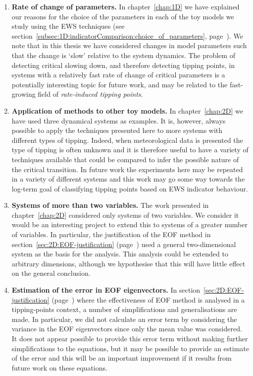 \begin{enumerate}
	\item {\bf Rate of change of parameters.} In chapter~\ref{chap:1D} we have explained our reasons for the choice of the parameters in each of the toy models we study using the EWS techniques (see section~\ref{subsec:1D:indicatorComparison:choice_of_parameters}, page~\pageref{subsec:1D:indicatorComparison:choice_of_parameters}). We note that in this thesis we have considered changes in model parameters such that the change is `slow' relative to the system dynamics. The problem of detecting critical slowing down, and therefore detecting tipping points, in systems with a relatively fast rate of change of critical parameters is a potentially interesting topic for future work, and may be related to the fast-growing field of \emph{rate-induced tipping points}. 
	
	\item {\bf Application of methods to other toy models.} In chapter~\ref{chap:2D} we have used three dynamical systems as examples. It is, however, always possible to apply the techniques presented here to more systems with different types of tipping. Indeed, when meteorological data is presented the type of tipping is often unknown and it is therefore useful to have a variety of techniques available that could be compared to infer the possible nature of the critical transition. In future work the experiments here may be repeated in a variety of different systems and this work may go some way towards the log-term goal of classifying tipping points based on EWS indicator behaviour.
	
	\item {\bf Systems of more than two variables.} The work presented in chapter~\ref{chap:2D} considered only systems of two variables. We consider it would be an interesting project to extend this to systems of a greater number of variables. In particular, the justification of the EOF method in section~\ref{sec:2D:EOF-justification} (page~\pageref{sec:2D:EOF-justification}) used a general two-dimensional system as the basis for the analysis. This analysis could be extended to arbitrary dimensions, although we hypothesise that this will have little effect on the general conclusion.
	
	\item {\bf Estimation of the error in EOF eigenvectors.} In section~\ref{sec:2D:EOF-justification} (page~\pageref{sec:2D:EOF-justification}) where the effectiveness of EOF method is analysed in a tipping-points context, a number of simplifications and generalisations are made. In particular, we did not calculate an error term by considering the variance in the EOF eigenvectors since only the mean value was considered. It does not appear possible to provide this error term without making further simplifications to the equations, but it may be possible to provide an estimate of the error and this will be an important improvement if it results from future work on these equations.
	

\end{enumerate}
